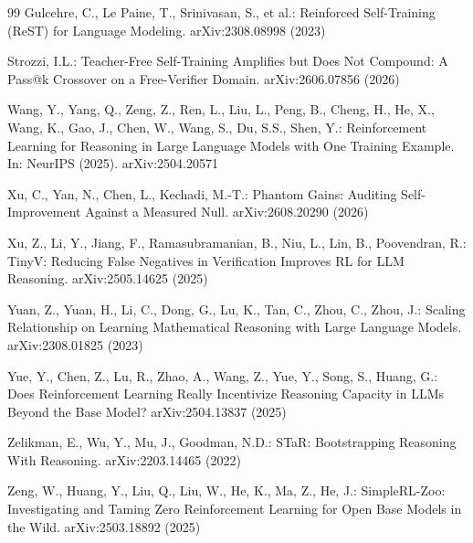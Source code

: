 \documentclass[runningheads]{llncs}
\begin{document}
\begin{thebibliography}{99}
Gulcehre, C., Le Paine, T., Srinivasan, S., et al.: Reinforced
Self-Training (ReST) for Language Modeling. arXiv:2308.08998 (2023)

Strozzi, I.L.: Teacher-Free Self-Training Amplifies but Does Not Compound:
A Pass@k Crossover on a Free-Verifier Domain. arXiv:2606.07856 (2026)

Wang, Y., Yang, Q., Zeng, Z., Ren, L., Liu, L., Peng, B., Cheng, H., He, X.,
Wang, K., Gao, J., Chen, W., Wang, S., Du, S.S., Shen, Y.: Reinforcement
Learning for Reasoning in Large Language Models with One Training Example.
In: NeurIPS (2025). arXiv:2504.20571

Xu, C., Yan, N., Chen, L., Kechadi, M.-T.: Phantom Gains: Auditing
Self-Improvement Against a Measured Null. arXiv:2608.20290 (2026)

Xu, Z., Li, Y., Jiang, F., Ramasubramanian, B., Niu, L., Lin, B.,
Poovendran, R.: TinyV: Reducing False Negatives in Verification Improves RL
for LLM Reasoning. arXiv:2505.14625 (2025)

Yuan, Z., Yuan, H., Li, C., Dong, G., Lu, K., Tan, C., Zhou, C., Zhou, J.:
Scaling Relationship on Learning Mathematical Reasoning with Large Language
Models. arXiv:2308.01825 (2023)

Yue, Y., Chen, Z., Lu, R., Zhao, A., Wang, Z., Yue, Y., Song, S., Huang,
G.: Does Reinforcement Learning Really Incentivize Reasoning Capacity in
LLMs Beyond the Base Model? arXiv:2504.13837 (2025)

Zelikman, E., Wu, Y., Mu, J., Goodman, N.D.: STaR: Bootstrapping Reasoning
With Reasoning. arXiv:2203.14465 (2022)

Zeng, W., Huang, Y., Liu, Q., Liu, W., He, K., Ma, Z., He, J.: SimpleRL-Zoo:
Investigating and Taming Zero Reinforcement Learning for Open Base Models in
the Wild. arXiv:2503.18892 (2025)

\end{thebibliography}
\end{document}
